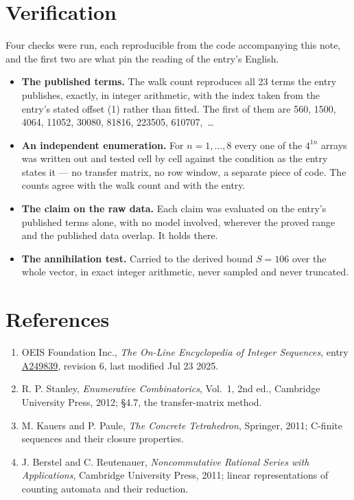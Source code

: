 \documentclass[11pt]{article}
\theoremstyle{definition}
\begin{document}
\section{Verification}

Four checks were run, each reproducible from the code accompanying this note, and the first two are what pin the reading of the entry's English.

\begin{itemize}

\item {\bfseries The published terms.} The walk count reproduces all 23 terms the entry publishes, exactly, in integer arithmetic, with the index taken from the entry's stated offset (1) rather than fitted. The first of them are 560, 1500, 4064, 11052, 30080, 81816, 223505, 610707,~\dots

\item {\bfseries An independent enumeration.} For $n = 1,\dots,8$ every one of the $4^{1n}$ arrays was written out and tested cell by cell against the condition as the entry states it --- no transfer matrix, no row window, a separate piece of code. The counts agree with the walk count and with the entry.

\item {\bfseries The claim on the raw data.} Each claim was evaluated on the entry's published terms alone, with no model involved, wherever the proved range and the published data overlap. It holds there.

\item {\bfseries The annihilation test.} Carried to the derived bound $S = 106$ over the whole vector, in exact integer arithmetic, never sampled and never truncated.

\end{itemize}

\section{References}

\begin{enumerate}

\item OEIS Foundation Inc., \emph{The On-Line Encyclopedia of Integer Sequences}, entry \href{https://oeis.org/A249839}{A249839}, revision 6, last modified Jul 23 2025.

\item R. P. Stanley, \emph{Enumerative Combinatorics}, Vol.~1, 2nd ed., Cambridge University Press, 2012; \S4.7, the transfer-matrix method.

\item M. Kauers and P. Paule, \emph{The Concrete Tetrahedron}, Springer, 2011; C-finite sequences and their closure properties.

\item J. Berstel and C. Reutenauer, \emph{Noncommutative Rational Series with Applications}, Cambridge University Press, 2011; linear representations of counting automata and their reduction.

\end{enumerate}
\end{document}
